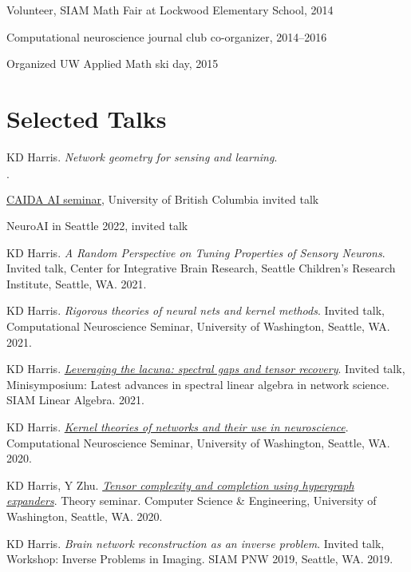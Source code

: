 \documentclass[margin,line]{res}
\newenvironment{list1}{
  \begin{list}{$\cdot$}{%
      \setlength{\itemsep}{0in}
      \setlength{\parsep}{0in} \setlength{\parskip}{0in}
      \setlength{\topsep}{0in} \setlength{\partopsep}{0in} 
      \setlength{\leftmargin}{0.17in}}}{\end{list}}
\begin{document}
\begin{resume}
  Volunteer, SIAM Math Fair at Lockwood Elementary School, 2014

  Computational neuroscience journal club co-organizer, 2014--2016

  Organized UW Applied Math ski day, 2015

  \section{\sc Selected Talks}

  KD Harris.
  \textit{Network geometry for sensing and learning}.
  \begin{list1}
  \item \href{https://www.youtube.com/watch?v=le5itcrXmCo}{CAIDA AI seminar}, University of British Columbia invited talk
  \item NeuroAI in Seattle 2022, invited talk
  \end{list1}

  KD Harris.
  \textit{A Random Perspective on Tuning Properties of Sensory Neurons}.
  Invited talk, Center for Integrative Brain Research,
  Seattle Children's Research Institute, Seattle, WA. 2021.
  
  KD Harris.
  \textit{Rigorous theories of neural nets and kernel methods}.
  Invited talk, Computational Neuroscience Seminar,
  University of Washington, Seattle, WA. 2021.
  
  KD Harris.
  \textit{\href{https://glomerul.us/presentations/2021-05-12_leveraging_lacuna.pdf}{Leveraging the lacuna: spectral gaps and tensor recovery}}.
  Invited talk, Minisymposium: 
  Latest advances in spectral linear algebra in network science.
  SIAM Linear Algebra. 2021.

  KD Harris.
  \textit{\href{https://glomerul.us/presentations/2020-06-17_kernel_neuroscience-expanded_notes.pdf}{Kernel theories of networks and their use in neuroscience}}.
  Computational Neuroscience Seminar, University of Washington, Seattle, WA. 2020.

  KD Harris, Y Zhu.
  \textit{\href{https://glomerul.us/presentations/2020-05-05_tensor_complexity_completion-expanded.pdf}{Tensor complexity and completion using hypergraph expanders}}.
  Theory seminar. 
  Computer Science \& Engineering, University of Washington,
  Seattle, WA. 2020.

  KD Harris.
  \textit{Brain network reconstruction as an inverse problem}.
  Invited talk, Workshop: Inverse Problems in Imaging.
  SIAM PNW 2019, Seattle, WA. 2019.


\end{resume}
\end{document}
